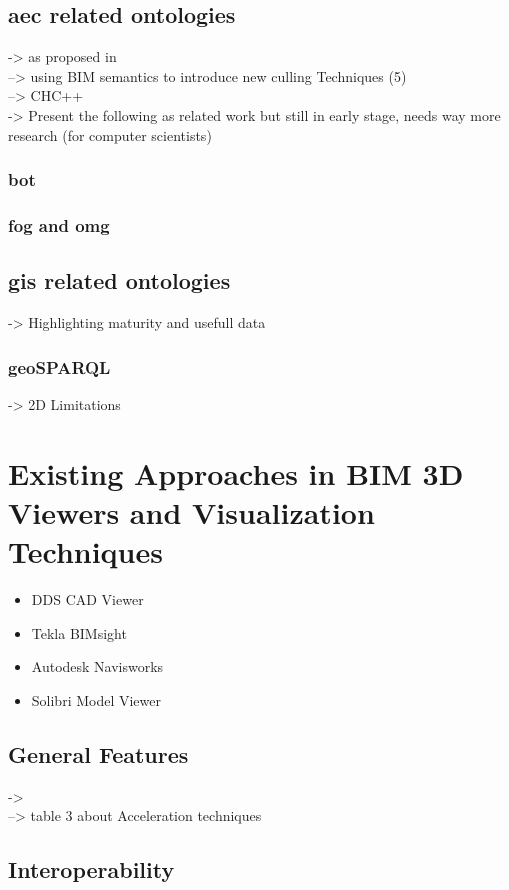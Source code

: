 \subsection{\acs{aec} related ontologies}
-> as proposed in \cite{Johansson2015}\\
--> using BIM semantics to introduce new culling Techniques (5)\\
--> CHC++ \\
-> Present the following as related work but still in early stage, needs way more research (for computer scientists)

\subsubsection{\acs{bot}}
\subsubsection{\acs{fog} and \acs{omg}}
\subsection{\acs{gis} related ontologies}
-> Highlighting maturity and usefull data

\subsubsection{geoSPARQL}
-> 2D Limitations

\section{Existing Approaches in BIM 3D Viewers and Visualization Techniques}
\begin{itemize}
    \item DDS CAD Viewer
    \item Tekla BIMsight
    \item Autodesk Navisworks
    \item Solibri Model Viewer
\end{itemize}

\subsection{General Features}
-> \cite{Johansson2015}\\
--> table 3 about Acceleration techniques\\

\subsection{Interoperability}

